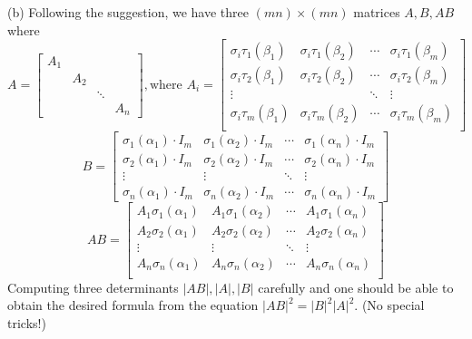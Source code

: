 \documentclass[../Marcus.tex]{subfiles}
\begin{document}
(b) Following the suggestion, we have three $(mn)\times(mn)$ matrices $A,B,AB$ where
$$
A=
\begin{bmatrix}
    A_1 &         &             &               \\
           & A_2 &             &               \\
           &         & \ddots &               \\
           &         &             & A_{n}
\end{bmatrix}, \text{where }
A_i=
\begin{bmatrix}
    \sigma_i\tau_1(\beta_1) & \sigma_i\tau_1(\beta_2) & \cdots & \sigma_i\tau_1(\beta_m)  \\
    \sigma_i\tau_2(\beta_1) & \sigma_i\tau_2(\beta_2) & \cdots & \sigma_i\tau_2(\beta_m) \\
    \vdots &     & \ddots & \vdots       \\
    \sigma_i\tau_m(\beta_1) & \sigma_i\tau_m(\beta_2) & \cdots & \sigma_i\tau_m(\beta_m) \\
\end{bmatrix}
$$
$$
B=\begin{bmatrix}
    \sigma_1(\alpha_1)\cdot I_m & \sigma_1(\alpha_2)\cdot I_m & \cdots & \sigma_1(\alpha_n)\cdot I_m  \\
    \sigma_2(\alpha_1)\cdot I_m & \sigma_2(\alpha_2)\cdot I_m & \cdots & \sigma_2(\alpha_n)\cdot I_m  \\
    \vdots & \vdots & \ddots & \vdots \\
    \sigma_n(\alpha_1)\cdot I_m & \sigma_n(\alpha_2)\cdot I_m & \cdots & \sigma_n(\alpha_n)\cdot I_m
\end{bmatrix}
$$
$$
AB=
\begin{bmatrix}
    A_1\sigma_1(\alpha_1) & A_1\sigma_1(\alpha_2) & \cdots & A_1\sigma_1(\alpha_n)  \\
    A_2\sigma_2(\alpha_1) & A_2\sigma_2(\alpha_2) & \cdots & A_2\sigma_2(\alpha_n)  \\
    \vdots & \vdots & \ddots & \vdots  \\
    A_n\sigma_n(\alpha_1) & A_n\sigma_n(\alpha_2) & \cdots & A_n\sigma_n(\alpha_n)  \\
\end{bmatrix}
$$
Computing three determinants $|AB|,|A|,|B|$ carefully and one should be able to obtain the desired formula from the equation $|AB|^2=|B|^2|A|^2$. (No special tricks!)
\end{document}
